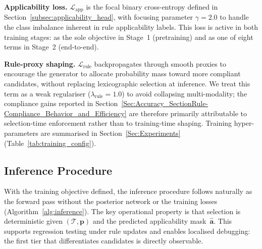\textbf{Applicability loss.}
$\mathcal{L}_{\text{app}}$ is the focal binary cross-entropy defined in Section~\ref{subsec:applicability_head}, with focusing parameter $\gamma{=}2.0$ to handle the class imbalance inherent in rule applicability labels.  This loss is active in both training stages: as the sole objective in Stage~1 (pretraining) and as one of eight terms in Stage~2 (end-to-end).

\textbf{Rule-proxy shaping.}
$\mathcal{L}_{\text{rule}}$ backpropagates through smooth proxies to encourage the generator to allocate probability mass toward more compliant candidates, without replacing lexicographic selection at inference.  We treat this term as a weak regulariser ($\lambda_{\text{rule}}{=}1.0$) to avoid collapsing multi-modality; the compliance gains reported in Section~\ref{Sec:Accuracy_SectionRule-Compliance_Behavior_and_Efficiency} are therefore primarily attributable to selection-time enforcement rather than to training-time shaping.  Training hyper-parameters are summarised in Section~\ref{Sec:Experiments} (Table~\ref{tab:training_config}).

\subsection{Inference Procedure}
\label{subsec:inference}

With the training objective defined, the inference procedure follows naturally as the forward pass without the posterior network or the training losses (Algorithm~\ref{alg:inference}).  The key operational property is that selection is deterministic given $(\mathcal{T},\mathbf{p})$ and the predicted applicability mask~$\hat{\mathbf{a}}$.  This supports regression testing under rule updates and enables localised debugging: the first tier that differentiates candidates is directly observable.

